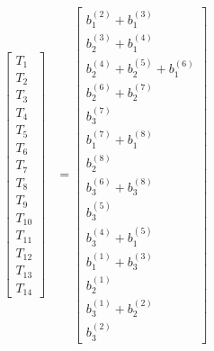 \documentclass[10pt]{article}
\begin{document}
\begin{landscape}
{{\begin{align*}
\left[\begin{matrix}T_{1}\\T_{2}\\T_{3}\\T_{4}\\T_{5}\\T_{6}\\T_{7}\\T_{8}\\T_{9}\\T_{10}\\T_{11}\\T_{12}\\T_{13}\\T_{14}\end{matrix}\right] &= \left[\begin{matrix}b^{(2)}_{1} + b^{(3)}_{1}\\b^{(3)}_{2} + b^{(4)}_{1}\\b^{(4)}_{2} + b^{(5)}_{2} + b^{(6)}_{1}\\b^{(6)}_{2} + b^{(7)}_{2}\\b^{(7)}_{3}\\b^{(7)}_{1} + b^{(8)}_{1}\\b^{(8)}_{2}\\b^{(6)}_{3} + b^{(8)}_{3}\\b^{(5)}_{3}\\b^{(4)}_{3} + b^{(5)}_{1}\\b^{(1)}_{1} + b^{(3)}_{3}\\b^{(1)}_{2}\\b^{(1)}_{3} + b^{(2)}_{2}\\b^{(2)}_{3}\end{matrix}\right] \\
\\

\end{align*}}}
\end{landscape}
\end{document}
